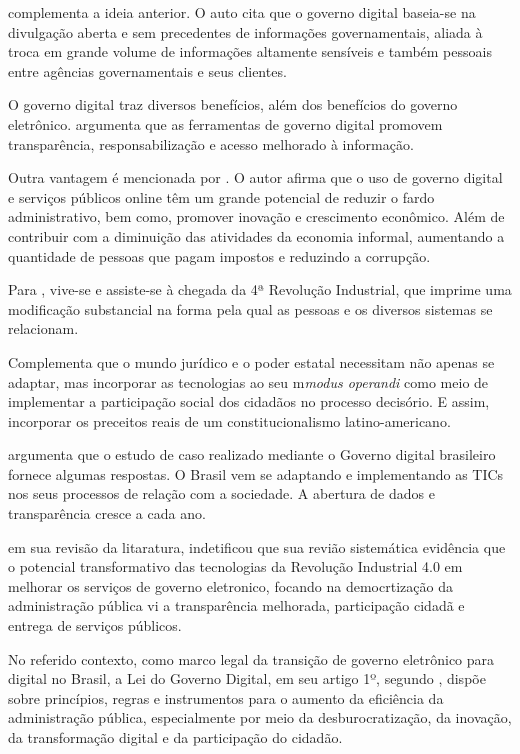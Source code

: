 \cite{bounabat2017government} complementa a ideia anterior. O auto cita que o governo digital baseia-se na divulgação aberta e sem precedentes de informações governamentais, aliada à troca em grande volume de informações altamente sensíveis e também pessoais entre agências governamentais e seus clientes. 

O governo digital traz diversos benefícios, além dos benefícios do governo eletrônico. \cite{martins2018war} argumenta que as ferramentas de governo digital promovem transparência, responsabilização e acesso melhorado à informação.

Outra vantagem é mencionada por \cite{veiga2016digital}. O autor afirma que o uso de governo digital e serviços públicos online têm um grande potencial de reduzir o fardo administrativo, bem como, promover inovação e crescimento econômico. Além de contribuir com a diminuição das atividades da economia informal, aumentando a quantidade de pessoas que pagam impostos e reduzindo a corrupção.

Para \cite{kreuz20184textordfeminine}, vive-se e assiste-se à chegada da 4ª Revolução Industrial, que imprime uma modificação substancial na forma pela qual as pessoas e os diversos sistemas se relacionam. 

Complementa \cite{kreuz20184textordfeminine} que o mundo jurídico e o poder estatal necessitam não apenas se adaptar, mas incorporar as tecnologias ao seu m\textit{modus operandi} como meio de implementar a participação social dos cidadãos no processo decisório. E assim, incorporar os preceitos reais de um constitucionalismo latino-americano.

\cite{kreuz20184textordfeminine} argumenta que o estudo de caso realizado mediante o Governo digital brasileiro fornece algumas respostas. O Brasil vem se adaptando e implementando as TICs nos seus processos de relação com a sociedade. A abertura de dados e transparência cresce a cada ano. 

\cite{kenosi2024industrial} em sua revisão da litaratura, indetificou que sua revião sistemática evidência que o potencial transformativo das tecnologias da Revolução Industrial 4.0 em melhorar os serviços de governo eletronico, focando na democrtização da administração pública vi a transparência melhorada, participação cidadã e entrega de serviços públicos.

No referido contexto, como marco legal da transição de governo eletrônico para digital  no Brasil, a Lei do Governo Digital, em seu artigo 1º, segundo \cite{l14129},  dispõe sobre princípios, regras e instrumentos para o aumento da eficiência da administração pública, especialmente por meio da desburocratização, da inovação, da transformação digital e da participação do cidadão.


